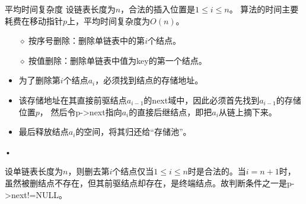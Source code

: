 \begin{frame}[fragile]\ft{\subsecname}
  
\end{frame}


\begin{frame}\ft{\subsecname}

\begin{block}{平均时间复杂度}
设链表长度为$n$，合法的插入位置是$1\le i \le n$。
算法的时间主要耗费在移动指针$p$上，平均时间复杂度为$O(n)$。
\end{block}

\end{frame}


\begin{frame}\ft{\subsecname}
\begin{itemize}
\item[$\diamond$]
按序号删除：删除单链表中的第$i$个结点。\\[0.2in]
\item[$\diamond$]
按值删除：删除单链表中值为key的第一个结点。
\end{itemize}
\end{frame}


\begin{frame}\ft{\subsecname}
 \begin{itemize}
\item 为了删除第$i$个结点$a_i$，必须找到结点的存储地址。
\item 该存储地址在其直接前驱结点$a_{i-1}$的next域中，因此必须首先找到$a_{i-1}$的存储位置$p$，
然后令{\ttfamily p->next}指向$a_i$的直接后继结点，即把$a_i$从链上摘下来。
\item
最后释放结点$a_i$的空间，将其归还给“存储池”。
\end{itemize}•
 
 
 设单链表长度为$n$，则删去第$i$个结点仅当$1\le i \le n$时是合法的。当$i=n+1$时，虽然被删结点不存在，但其前驱结点却存在，是终端结点。故判断条件之一是{\ttfamily p->next!=NULL}。
 
\end{frame}

\begin{frame}[fragile]\ft{\subsecname}
  
\end{frame}

